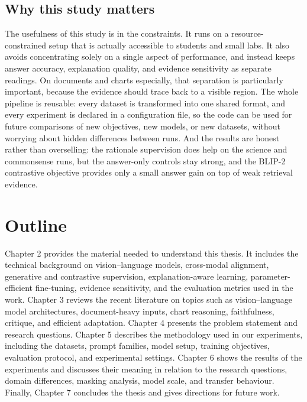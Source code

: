\subsection{Why this study matters}
The usefulness of this study is in the constraints.
It runs on a resource-constrained setup that is actually accessible to students and small labs.
It also avoids concentrating solely on a single aspect of performance, and instead keeps answer accuracy, explanation quality, and evidence sensitivity as separate readings.
On documents and charts especially, that separation is particularly important, because the evidence should trace back to a visible region.
The whole pipeline is reusable: every dataset is transformed into one shared format, and every experiment is declared in a configuration file,
so the code can be used for future comparisons of new objectives, new models, or new datasets, without worrying about hidden differences between runs.
And the results are honest rather than overselling: the rationale supervision does help on the science and commonsense runs, but the answer-only controls stay strong,
and the BLIP-2 contrastive objective provides only a small answer gain on top of weak retrieval evidence.

\section{Outline}
Chapter 2 provides the material needed to understand this thesis.
It includes the technical background on vision--language models, cross-modal alignment,
generative and contrastive supervision, explanation-aware learning,
parameter-efficient fine-tuning, evidence sensitivity, and the evaluation metrics used in the work.
Chapter 3 reviews the recent literature on topics such as vision--language model architectures,
document-heavy inputs, chart reasoning, faithfulness, critique, and efficient adaptation.
Chapter 4 presents the problem statement and research questions.
Chapter 5 describes the methodology used in our experiments,
including the datasets, prompt families, model setup, training objectives, evaluation protocol, and experimental settings.
Chapter 6 shows the results of the experiments and discusses their meaning in relation to the research questions, domain differences, masking analysis, model scale, and transfer behaviour.
Finally, Chapter 7 concludes the thesis and gives directions for future work.
